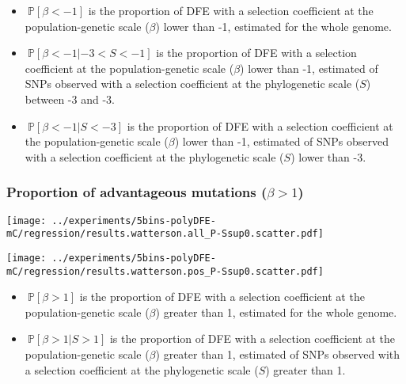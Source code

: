 \documentclass{article}
\newcommand{\proba}{\mathbb{P}}
\newcommand{\Sphy}{S}
\newcommand{\divStrongDel}{\Sphy < -3}
\newcommand{\divDel}{-3 < \Sphy < -1}
\newcommand{\divAdv}{ \Sphy > 1}
\newcommand{\Spop}{\beta}
\newcommand{\polyDel}{\Spop < -1}
\newcommand{\polyAdv}{ \Spop > 1}
\begin{document}
    \begin{itemize}
        \item $\ \proba [ \polyDel ]$ is the proportion of DFE with a selection coefficient at the population-genetic scale ($\Spop$) lower than -1, estimated for the whole genome.
        \item $\ \proba [ \polyDel | \divDel]$ is the proportion of DFE with a selection coefficient at the population-genetic scale ($\Spop$) lower than -1, estimated of SNPs observed with a selection coefficient at the phylogenetic scale ($\Sphy$) between -3 and -3.
        \item $\ \proba [ \polyDel | \divStrongDel ]$ is the proportion of DFE with a selection coefficient at the population-genetic scale ($\Spop$) lower than -1, estimated of SNPs observed with a selection coefficient at the phylogenetic scale ($\Sphy$) lower than -3.
    \end{itemize}

    \subsubsection{Proportion of advantageous mutations ($\polyAdv$)}

    \begin{minipage}{0.32\linewidth}
        \texttt{[image: ../experiments/5bins-polyDFE-mC/regression/results.watterson.all\_P-Ssup0.scatter.pdf]}
    \end{minipage}
    \begin{minipage}{0.32\linewidth}
        \texttt{[image: ../experiments/5bins-polyDFE-mC/regression/results.watterson.pos\_P-Ssup0.scatter.pdf]}
    \end{minipage}

    \begin{itemize}
        \item $\ \proba [ \polyAdv  ]$ is the proportion of DFE with a selection coefficient at the population-genetic scale ($\Spop$) greater than 1, estimated for the whole genome.
        \item $\ \proba [ \polyAdv | \divAdv] $ is the proportion of DFE with a selection coefficient at the population-genetic scale ($\Spop$) greater than 1, estimated of SNPs observed with a selection coefficient at the phylogenetic scale ($\Sphy$) greater than 1.
    \end{itemize}


    
\end{document}

